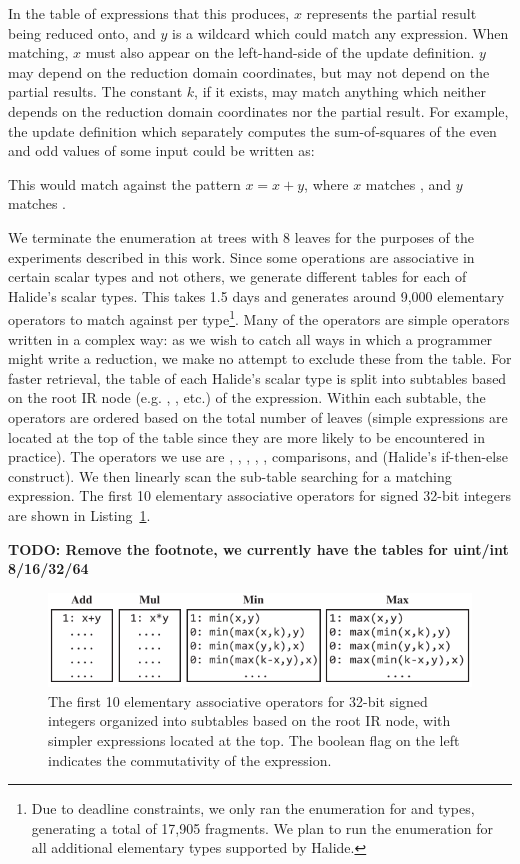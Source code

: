In the table of expressions that this produces, $x$ represents the partial result being reduced onto, and $y$ is a wildcard which could match any expression. When matching, $x$ must also appear on the left-hand-side of the update definition. $y$ may depend on the reduction domain coordinates, but may not depend on the partial results. The constant $k$, if it exists, may match anything which neither depends on the reduction domain coordinates nor the partial result. For example, the update definition which separately computes the sum-of-squares of the even and odd values of some input  could be written as:


\noindent This would match against the pattern $x = x + y$, where $x$ matches , and $y$ matches .

We terminate the enumeration at trees with 8 leaves for the purposes of the experiments described in this work. Since some operations are associative in certain scalar types and not others, we generate different tables for each of Halide's scalar types.  This takes 1.5 days and generates around 9,000 elementary operators to match against per type\footnote{Due to deadline constraints, we only ran the enumeration for  and  types, generating a total of 17,905 fragments.  We plan to run the enumeration for all additional elementary types supported by Halide.}. Many of the operators are simple operators written in a complex way: as we wish to catch all ways in which a programmer might write a reduction, we make no attempt to exclude these from the table. For faster retrieval, the table of each Halide's scalar type is split into subtables based on the root IR node (e.g. , , etc.) of the expression. Within each subtable, the operators are ordered based on the total number of leaves (simple expressions are located at the top of the table since they are more likely to be encountered in practice). The operators we use are , , , , , comparisons, and  (Halide’s if-then-else construct). We then linearly scan the sub-table searching for a matching expression. The first 10 elementary associative operators for signed 32-bit integers are shown in Listing~\ref{fig:top10}. 

\textbf{TODO: Remove the footnote, we currently have the tables for uint/int 8/16/32/64}

\begin{figure}
\centering
\includegraphics[width=\columnwidth]{tables}
\caption{The first 10 elementary associative operators for 32-bit signed integers organized into subtables based on the root IR node, with simpler expressions located at the top. The boolean flag on the left indicates the commutativity of the expression.}
\label{fig:top10}
\end{figure}

